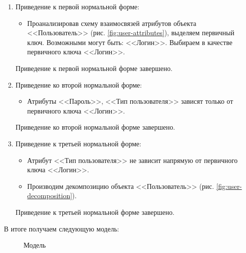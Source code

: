 \begin{enumerate}
    \item Приведение к первой нормальной форме:
    \begin{itemize}
        \item Проанализировав схему взаимосвязей атрибутов объекта <<Пользователь>> (рис. \ref{fig:user-attributes}), выделяем первичный ключ. Возможными могут быть: <<Логин>>. Выбираем в качестве первичного ключа <<Логин>>.
    \end{itemize}
    \tab\tab Приведение к первой нормальной форме завершено.

    \item Приведение ко второй нормальной форме:
    \begin{itemize}
        \item Атрибуты <<Пароль>>, <<Тип пользователя>> зависят только от первичного ключа <<Логин>>.
    \end{itemize}
    \tab\tab Приведение ко второй нормальной форме завершено.

    \item Приведение к третьей нормальной форме:
    \begin{itemize}
        \item Атрибут <<Тип пользователя>> не зависит напрямую от первичного ключа <<Логин>>.
        \item Производим декомпозицию объекта <<Пользователь>> (рис. \ref{fig:user-decomposition}).
    \end{itemize}
    \tab\tab Приведение к третьей нормальной форме завершено.
\end{enumerate}


В итоге получаем следующую модель:
\begin{figure}[H]
    \caption{Модель}
    \label{fig:model}
\end{figure}